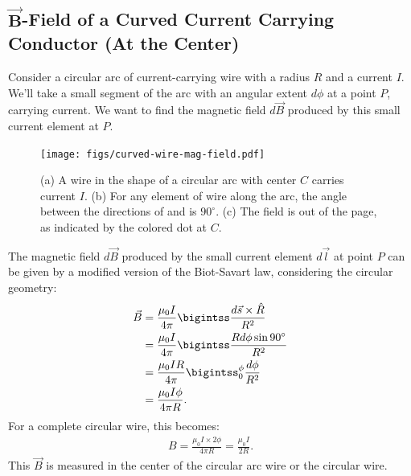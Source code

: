 \documentclass[12pt,b4paper]{article}
\begin{document}
\subsection{$\boldsymbol{\vec{B}}$-Field of a Curved Current Carrying Conductor (At the Center)}
Consider a circular arc of current-carrying wire with a radius $R$ and a current $I$. We'll take a small segment of the arc with an angular extent $d\phi$ at a point $P$, carrying current. We want to find the magnetic field $d\vec{B}$ produced by this small current element at $P$.
\begin{figure}[H]
    \centering
    \texttt{[image: figs/curved-wire-mag-field.pdf]}
    \caption{(a) A wire in the shape of a circular arc with center $C$ carries current $I$. (b) For any element of wire along the arc, the angle between the directions of and is $90^\circ$. (c) The field is out of the page, as indicated by the colored dot at $C$.}
    \label{fig:curved-wire-mag-field}
\end{figure}
The magnetic field $d\vec{B}$ produced by the small current element $d\vec{l}$ at point $P$ can be given by a modified version of the Biot-Savart law, considering the circular geometry:
\begin{align}
    \vec{B}&=\frac{\mu_0I}{4\pi}\bigintss\frac{d\vec{s}\times\hat{R}}{R^2}\notag\\
    &=\frac{\mu_0I}{4\pi}\bigintss\frac{Rd\phi\sin90^\circ}{R^2}\notag\\
    &=\frac{\mu_0IR}{4\pi}\bigintss_0^\phi\frac{d\phi}{R^2}\notag\\
    &=\frac{\mu_0I\phi}{4\pi R}.
\end{align}
For a complete circular wire, this becomes:
\begin{align}
    B=\frac{\mu_0I\times2\phi}{4\pi R}=\frac{\mu_0I}{2R}.\label{eq:complete-circular-wire}
\end{align}
This $\vec{B}$ is measured in the center of the circular arc wire or the circular wire.
\end{document}
